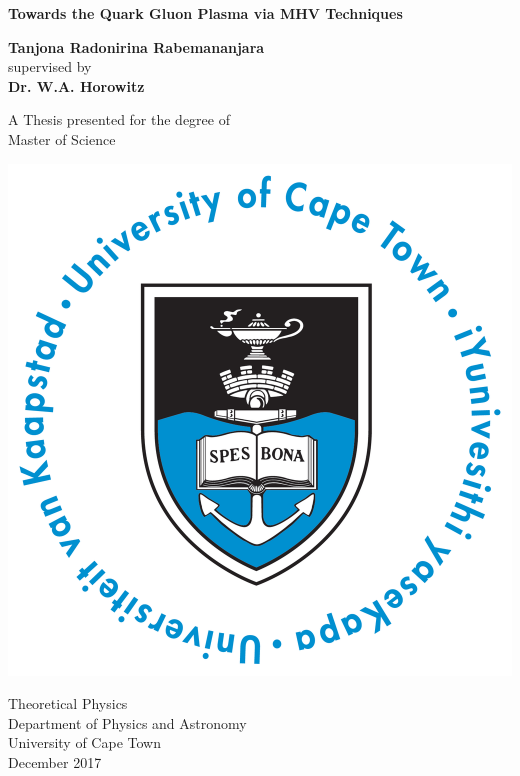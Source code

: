 \thispagestyle{empty}
\begin{center}
  \vspace*{1cm}
  {\LARGE \bf Towards the Quark Gluon Plasma via MHV Techniques}

  \vspace*{1.5cm}
  {\large \bf Tanjona Radonirina Rabemananjara } \\
  supervised by\\
  {\large \bf Dr. W.A. Horowitz }
  
  \vspace*{1cm}

  {\Large A Thesis presented for the degree of\\
         [1mm] Master of Science}
  \vspace*{0.9cm}
  
   \begin{center}
   \includegraphics[scale=.5]{UCT}
   \end{center}

  {\large Theoretical Physics\\
          [-3mm] Department of Physics and Astronomy\\
          [-3mm] University of Cape Town\\
          [1mm]  December 2017}

\end{center}


